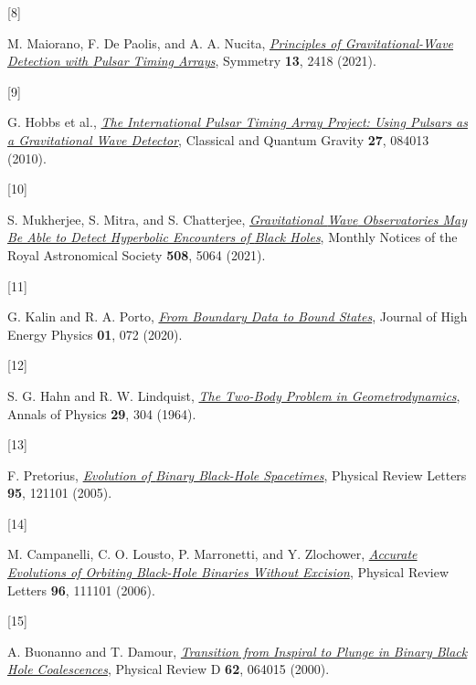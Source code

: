 \documentclass[
  10pt,
  a4paper,
  DIV=11,
  numbers=noendperiod,
  oneside]{scrreprt}
\newlength{\cslhangindent}
\newlength{\csllabelwidth}
\newlength{\cslentryspacingunit} %
\newenvironment{CSLReferences}[2] %
 {%
  \setlength{\parindent}{0pt}
  \ifodd #1
  \let\oldpar\par
  \def\par{\hangindent=\cslhangindent\oldpar}
  \fi
  \setlength{\parskip}{#2\cslentryspacingunit}
 }%
 {}
\newcommand{\CSLLeftMargin}[1]{\parbox[t]{\csllabelwidth}{#1}}
\newcommand{\CSLRightInline}[1]{\parbox[t]{\linewidth - \csllabelwidth}{#1}\break}
\DeclareRobustCommand{\[}{\begin{equation}}
\DeclareRobustCommand{\]}{\end{equation}}
\begin{document}
\begin{CSLReferences}{0}{0}
\leavevmode{}%
\CSLLeftMargin{{[}8{]} }%
\CSLRightInline{M. Maiorano, F. De Paolis, and A. A. Nucita,
\emph{\href{https://doi.org/10.3390/sym13122418}{Principles of
{Gravitational-Wave Detection} with {Pulsar Timing Arrays}}}, Symmetry
\textbf{13}, 2418 (2021).}

\leavevmode{}%
\CSLLeftMargin{{[}9{]} }%
\CSLRightInline{G. Hobbs et al.,
\emph{\href{https://doi.org/10.1088/0264-9381/27/8/084013}{The
International Pulsar Timing Array Project: Using Pulsars as a
Gravitational Wave Detector}}, Classical and Quantum Gravity
\textbf{27}, 084013 (2010).}

\leavevmode{}%
\CSLLeftMargin{{[}10{]} }%
\CSLRightInline{S. Mukherjee, S. Mitra, and S. Chatterjee,
\emph{\href{https://doi.org/10.1093/mnras/stab2721}{Gravitational {Wave}
Observatories May Be Able to Detect Hyperbolic Encounters of {Black
Holes}}}, Monthly Notices of the Royal Astronomical Society
\textbf{508}, 5064 (2021).}

\leavevmode{}%
\CSLLeftMargin{{[}11{]} }%
\CSLRightInline{G. Kalin and R. A. Porto,
\emph{\href{https://doi.org/10.1007/JHEP01(2020)072}{From Boundary Data
to Bound States}}, Journal of High Energy Physics \textbf{01}, 072
(2020).}

\leavevmode{}%
\CSLLeftMargin{{[}12{]} }%
\CSLRightInline{S. G. Hahn and R. W. Lindquist,
\emph{\href{https://doi.org/10.1016/0003-4916(64)90223-4}{The Two-Body
Problem in Geometrodynamics}}, Annals of Physics \textbf{29}, 304
(1964).}

\leavevmode{}%
\CSLLeftMargin{{[}13{]} }%
\CSLRightInline{F. Pretorius,
\emph{\href{https://doi.org/10.1103/PhysRevLett.95.121101}{Evolution of
{Binary Black-Hole Spacetimes}}}, Physical Review Letters \textbf{95},
121101 (2005).}

\leavevmode{}%
\CSLLeftMargin{{[}14{]} }%
\CSLRightInline{M. Campanelli, C. O. Lousto, P. Marronetti, and Y.
Zlochower,
\emph{\href{https://doi.org/10.1103/PhysRevLett.96.111101}{Accurate
{Evolutions} of {Orbiting Black-Hole Binaries} Without {Excision}}},
Physical Review Letters \textbf{96}, 111101 (2006).}

\leavevmode{}%
\CSLLeftMargin{{[}15{]} }%
\CSLRightInline{A. Buonanno and T. Damour,
\emph{\href{https://doi.org/10.1103/PhysRevD.62.064015}{Transition from
Inspiral to Plunge in Binary Black Hole Coalescences}}, Physical Review
D \textbf{62}, 064015 (2000).}


\end{CSLReferences}
\end{document}
